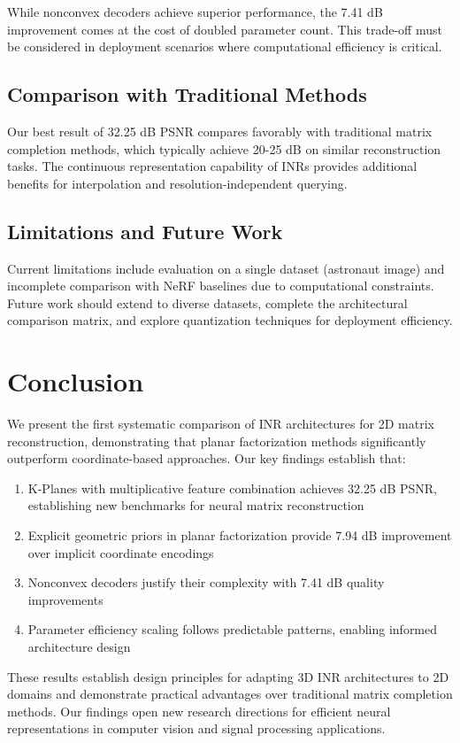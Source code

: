 \documentclass[10pt,twocolumn,letterpaper]{article}
\begin{document}
While nonconvex decoders achieve superior performance, the 7.41 dB improvement comes at the cost of doubled parameter count. This trade-off must be considered in deployment scenarios where computational efficiency is critical.

\subsection{Comparison with Traditional Methods}

Our best result of 32.25 dB PSNR compares favorably with traditional matrix completion methods, which typically achieve 20-25 dB on similar reconstruction tasks. The continuous representation capability of INRs provides additional benefits for interpolation and resolution-independent querying.

\subsection{Limitations and Future Work}

Current limitations include evaluation on a single dataset (astronaut image) and incomplete comparison with NeRF baselines due to computational constraints. Future work should extend to diverse datasets, complete the architectural comparison matrix, and explore quantization techniques for deployment efficiency.

\section{Conclusion}

We present the first systematic comparison of INR architectures for 2D matrix reconstruction, demonstrating that planar factorization methods significantly outperform coordinate-based approaches. Our key findings establish that:

\begin{enumerate}
\item K-Planes with multiplicative feature combination achieves 32.25 dB PSNR, establishing new benchmarks for neural matrix reconstruction
\item Explicit geometric priors in planar factorization provide 7.94 dB improvement over implicit coordinate encodings
\item Nonconvex decoders justify their complexity with 7.41 dB quality improvements
\item Parameter efficiency scaling follows predictable patterns, enabling informed architecture design
\end{enumerate}

These results establish design principles for adapting 3D INR architectures to 2D domains and demonstrate practical advantages over traditional matrix completion methods. Our findings open new research directions for efficient neural representations in computer vision and signal processing applications.

\small


\end{document}
